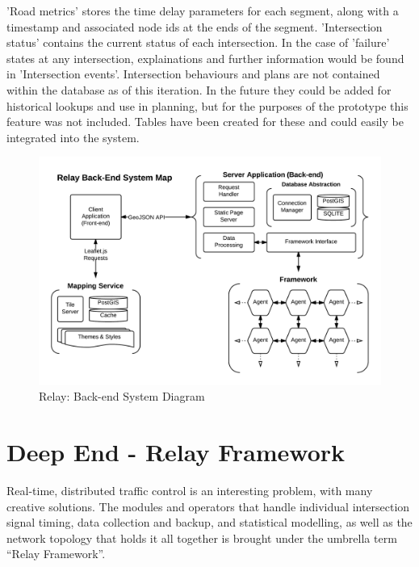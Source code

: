 \documentclass{report}
\begin{document}
'Road metrics' stores the time delay parameters for each segment, along with a timestamp and associated node ids at the ends of the segment. 
'Intersection status' contains the current status of each intersection. 
In the case of 'failure' states at any intersection, explainations and further information would be found in 'Intersection events'. 
Intersection behaviours and plans are not contained within the database as of this iteration. 
In the future they could be added for historical lookups and use in planning, but for the purposes of the prototype this feature was not included. 
Tables have been created for these and could easily be integrated into the system.

\begin{figure}[H]
  \begin{centering}
    \includegraphics[scale=0.3,  angle=90]{figures/Relay_Backend_System_Diagram.png}
    \caption{Relay: Back-end System Diagram}
    \label{fig:system-diagram}
  \end{centering}
\end{figure}

\section{Deep End - Relay Framework}

Real-time, distributed traffic control is an interesting problem, with many creative solutions.
The modules and operators that handle individual intersection signal timing, data collection and backup, and statistical modelling, as well as the network topology that holds it all together is brought under the umbrella term ``Relay Framework''. \\
\end{document}
